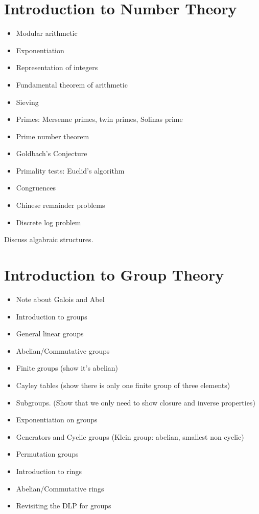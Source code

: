 \documentclass[11pt]{book}
\begin{document}
\section{Introduction to Number Theory}
\begin{itemize}
	\item Modular arithmetic
	\item Exponentiation
	\item Representation of integers
	\item Fundamental theorem of arithmetic
	\item Sieving
	\item Primes: Mersenne primes, twin primes, Solinas prime
	\item Prime number theorem
	\item Goldbach's Conjecture
	\item Primality tests: Euclid's algorithm
	\item Congruences
	\item Chinese remainder problems
	\item Discrete log problem
\end{itemize}


Discuss algabraic structures.

\section{Introduction to Group Theory}
\begin{itemize}
	\item Note about Galois and Abel
	\item Introduction to groups
	\item General linear groups
	\item Abelian/Commutative groups
	\item Finite groups (show it's abelian)
	\item Cayley tables (show there is only one finite group of three elements)
	\item Subgroups. (Show that we only need to show closure and inverse properties)
	\item Exponentiation on groups
	\item Generators and Cyclic groups (Klein group: abelian, smallest non cyclic)
	\item Permutation groups
	\item Introduction to rings
	\item Abelian/Commutative rings
	\item Revisiting the DLP for groups
\end{itemize}
\end{document}
